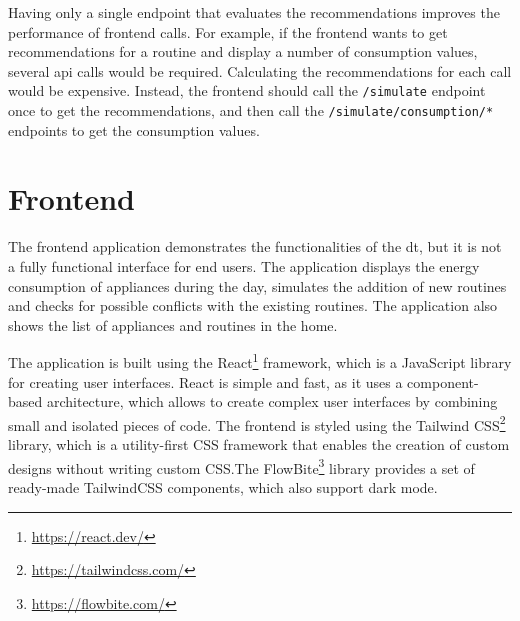 Having only a single endpoint that evaluates the recommendations improves the performance of frontend calls. For example, if the frontend wants to get recommendations for a routine and display a number of consumption values, several \acrshort{api} calls would be required. Calculating the recommendations for each call would be expensive. Instead, the frontend should call the \texttt{/simulate} endpoint once to get the recommendations, and then call the \texttt{/simulate/consumption/*} endpoints to get the consumption values.

\section{Frontend}

The frontend application demonstrates the functionalities of the \acrshort{dt}, but it is not a fully functional interface for end users. The application displays the energy consumption of appliances during the day, simulates the addition of new routines and checks for possible conflicts with the existing routines. The application also shows the list of appliances and routines in the home.

The application is built using the React\footnote{\url{https://react.dev/}} framework, which is a JavaScript library for creating user interfaces. React is simple and fast, as it uses a component-based architecture, which allows to create complex user interfaces by combining small and isolated pieces of code. The frontend is styled using the Tailwind CSS\footnote{\url{https://tailwindcss.com/}} library, which is a utility-first CSS framework that enables the creation of custom designs without writing custom CSS.\@ The FlowBite\footnote{\url{https://flowbite.com/}} library provides a set of ready-made TailwindCSS components, which also support dark mode.

